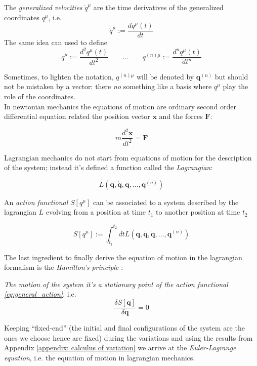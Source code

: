 \begin{definition}
  The \emph{generalized velocities} $\dot{q}^{\mu}$ are the time derivatives of
  the generalized coordinates $q^{\mu}$, i.e.
  \begin{equation*}
    \dot{q}^{\mu} := \frac{dq^{\mu}(t)}{dt}
  \end{equation*}
  The same idea can used to define
  \begin{equation*}
    \ddot{q}^{\mu} := \frac{d^2q^{\mu}(t)}{dt^2} \qquad \ldots \qquad
        q^{(n)\mu} := \frac{d^nq^{\mu}(t)}{dt^n}
  \end{equation*}
\end{definition}

Sometimes, to lighten the notation, $q^{(n)\mu}$ will be denoted by
$\bm{q}^{(n)}$ but should not be mistaken by a vector: there \emph{no} something
like a basis where $q^{\mu}$ play the role of the coordinates. \\

In newtonian mechanics the equations of motion are ordinary second order
differential equation related the position vector $\bm{x}$ and the forces
$\bm{F}$:

\begin{equation*}
  m \frac{d^2\bm{x}}{dt^2} = \bm{F}
\end{equation*}

Lagrangian mechanics do not start from equations of motion for the description
of the system; instead it's defined a function called the \emph{Lagrangian}:

\begin{equation} \label{eq:general_lagrangian}
  L(\bm{q}, \dot{\bm{q}}, \ddot{\bm{q}}, \ldots, \bm{q}^{(n)})
\end{equation}

An \emph{action functional} $S[q^{\mu}]$ can be associated to a system described
by the lagrangian $L$ evolving from a position at time $t_1$ to another position
at time $t_2$

\begin{equation} \label{eq:general_action}
  S[q^{\mu}] := \int_{t_1}^{t_2} dt
  L(\bm{q}, \dot{\bm{q}}, \ddot{\bm{q}}, \ldots, \bm{q}^{(n)})
\end{equation}

The last ingredient to finally derive the equation of motion in the lagrangian
formalism is the \emph{Hamilton's principle} \cite{Goldstein11_Ham_principle}:
\begin{displayquote}
  \emph{The motion of the system it's a stationary point of the action
  functional \eqref{eq:general_action}}, i.e.
  \begin{equation*}
    \frac{\delta S[\bm{q}]}{\delta \bm{q}} = 0
  \end{equation*}
\end{displayquote}
Keeping ``fixed-end'' (the initial and final configurations of the system are
the ones we choose hence are fixed) during the variations and using the results
from Appendix \ref{appendix: calculus of variation} we arrive at the
\emph{Euler-Lagrange equation}, i.e. the equation of motion in lagrangian
mechanics.

